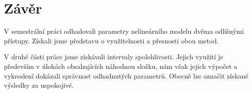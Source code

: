 \section{Závěr}

V semestrální práci odhadovali parametry nelineárního modelu dvěma odlišnými přístupy.
Získali jsme představu o využitelnosti a přesnosti obou metod.

V druhé části práce jsme získávali intervaly spolehlivosti.
Jejich využití je především v úlohách obsahujících náhodnou složku, nám však jejich výpočet a vykreslení dokázali správnost odhadnutých parametrů.
Obecně lze označit získané výsledky za uspokojivé.
